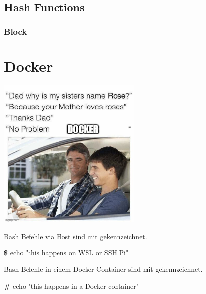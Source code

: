 \documentclass[
  10pt,
  a4paper,
  twocolumn]{article}
\newenvironment{Shaded}{}{}
\newcommand{\ExtensionTok}[1]{\textcolor[rgb]{0.84,0.23,0.29}{\textbf{#1}}}
\newcommand{\NormalTok}[1]{\textcolor[rgb]{0.14,0.16,0.18}{#1}}
\newcommand{\StringTok}[1]{\textcolor[rgb]{0.01,0.18,0.38}{#1}}
\begin{document}
\subsection{Hash Functions}\label{hash-functions}

\subsubsection{Block}\label{block}

\section{\texorpdfstring{Docker }{Docker }}\label{docker}

\begin{center}
\includegraphics[width=7cm,height=\textheight]{images/meme_docker.jpg}
\end{center}

\begin{tcolorbox}[enhanced jigsaw, colback=white, leftrule=.75mm, rightrule=.15mm, bottomrule=.15mm, toprule=.15mm, colbacktitle=quarto-callout-important-color!10!white, breakable, opacityback=0, bottomtitle=1mm, titlerule=0mm, toptitle=1mm, title=\textcolor{quarto-callout-important-color}{\faExclamation}\hspace{0.5em}{Wichtig}, coltitle=black, arc=.35mm, left=2mm, colframe=quarto-callout-important-color-frame, opacitybacktitle=0.6]

Bash Befehle via Host sind mit {\color{BrickRed}{\texttt{\textbf{\$}}}}
gekennzeichnet.

\begin{Shaded}
\begin{Highlighting}[]
\ExtensionTok{\$}\NormalTok{ echo }\StringTok{"this happens on WSL or SSH Pi"}
\end{Highlighting}
\end{Shaded}

Bash Befehle in einem Docker Container sind mit
{\color{BrickRed}{\texttt{\textbf{\#}}}} gekennzeichnet.

\begin{Shaded}
\begin{Highlighting}[]
\ExtensionTok{\#}\NormalTok{ echo }\StringTok{"this happens in a Docker container"}
\end{Highlighting}
\end{Shaded}

\end{tcolorbox}
\end{document}
